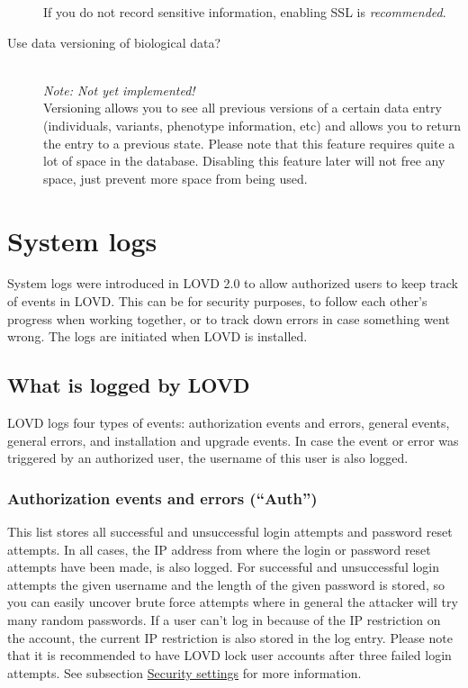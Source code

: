 \documentclass[a4paper,oneside,openany,12pt]{memoir}
\renewenvironment{leftbar}[1][\hsize]
{%
    \def\FrameCommand
    {%
        {\color{LOVDdark}\vrule width 3pt \hspace{5pt}}%
        \colorbox{LOVDlight}%
    }%
    \MakeFramed{\hsize#1\advance\hsize-\width\FrameRestore}%
}
{\endMakeFramed}
\begin{document}
\begin{description}
  \nopagebreak
  If you do not record sensitive information, enabling SSL is \emph{recommended}.
  \item[Use data versioning of biological data?] \hfill \\
  \emph{Note: Not yet implemented!}
  \\
  Versioning allows you to see all previous versions of a certain data entry (individuals, variants, phenotype information, etc) and allows you to return the entry to a previous state.
  Please note that this feature requires quite a lot of space in the database.
  Disabling this feature later will not free any space, just prevent more space from being used.
\end{description}





\section{System logs}
System logs were introduced in LOVD 2.0 to allow authorized users to keep track of events in LOVD.
This can be for security purposes, to follow each other's progress when working together,
or to track down errors in case something went wrong.
The logs are initiated when LOVD is installed.



\subsection{What is logged by LOVD}
LOVD logs four types of events: authorization events and errors, general events, general errors, and installation and upgrade events.
In case the event or error was triggered by an authorized user, the username of this user is also logged.

\subsubsection{Authorization events and errors (``Auth'')}
This list stores all successful and unsuccessful login attempts and password reset attempts.
In all cases, the IP address from where the login or password reset attempts have been made, is also logged.
For successful and unsuccessful login attempts the given username and the length of the given password is stored, so you can easily uncover brute force attempts where in general the attacker will try many random passwords.
If a user can't log in because of the IP restriction on the account, the current IP restriction is also stored in the log entry.
Please note that it is recommended to have LOVD lock user accounts after three failed login attempts. See subsection \hyperlink{ss_security_settings}{Security settings} for more information.
\end{document}
